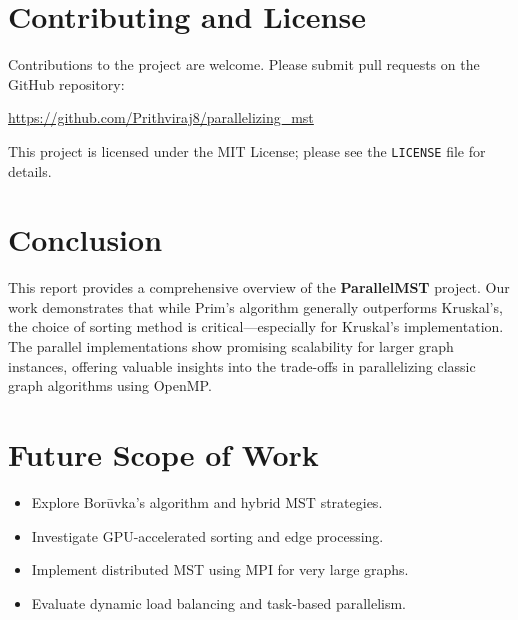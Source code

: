 \documentclass[11pt]{article}
\begin{document}
\section{Contributing and License}
Contributions to the project are welcome. Please submit pull requests on the GitHub repository:
\begin{center}
\url{https://github.com/Prithviraj8/parallelizing_mst}
\end{center}
This project is licensed under the MIT License; please see the \texttt{LICENSE} file for details.

\section{Conclusion}
This report provides a comprehensive overview of the \textbf{ParallelMST} project. Our work demonstrates that while Prim's algorithm generally outperforms Kruskal's, the choice of sorting method is critical—especially for Kruskal's implementation. The parallel implementations show promising scalability for larger graph instances, offering valuable insights into the trade-offs in parallelizing classic graph algorithms using OpenMP.

\section{Future Scope of Work}
\begin{itemize}
  \item Explore Bor\={u}vka's algorithm and hybrid MST strategies.
  \item Investigate GPU-accelerated sorting and edge processing.
  \item Implement distributed MST using MPI for very large graphs.
  \item Evaluate dynamic load balancing and task-based parallelism.
\end{itemize}
\end{document}
